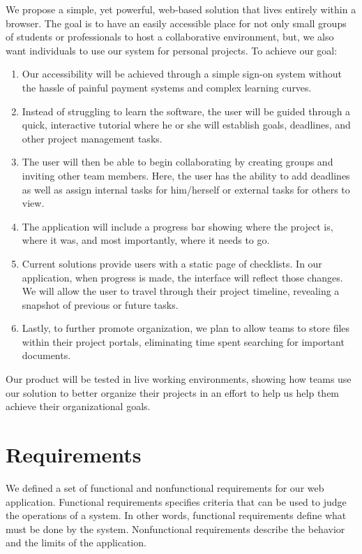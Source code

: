We propose a simple, yet powerful, web-based solution that lives entirely within a browser. The goal is to have an easily accessible place for not only small groups of students or professionals to host a collaborative environment, but, we also want individuals to use our system for personal projects. To achieve our goal: 
\begin{enumerate}
	\item Our accessibility will be achieved through a simple sign-on system without the hassle of painful payment systems and complex learning curves. 
	\item Instead of struggling to learn the software, the user will be guided through a quick, interactive tutorial where he or she will establish goals, deadlines, and other project management tasks. 
	\item The user will then be able to begin collaborating by creating groups and inviting other team members. Here, the user has the ability to add deadlines as well as assign internal tasks for him/herself or external tasks for others to view. 
	\item The application will include a progress bar showing where the project is, where it was, and most importantly, where it needs to go. 
	\item Current solutions provide users with a static page of checklists. In our application, when progress is made, the interface will reflect those changes. We will allow the user to travel through their project timeline, revealing a snapshot of previous or future tasks. 
	\item Lastly, to further promote organization, we plan to allow teams to store files within their project portals, eliminating time spent searching for important documents. 
\end{enumerate}
Our product will be tested in live working environments, showing how teams use our solution to better organize their projects in an effort to help us help them achieve their organizational goals. 

\section{Requirements}
We defined a set of functional and nonfunctional requirements for our web application. Functional requirements specifies criteria that can be used to judge the operations of a system. In other words, functional requirements define what must be done by the system. Nonfunctional requirements describe the behavior and the limits of the application. 

